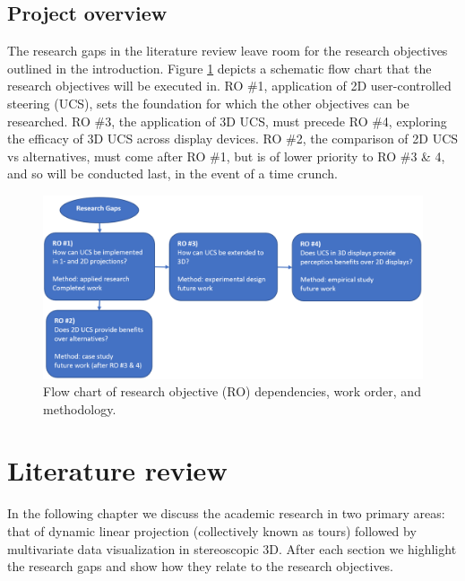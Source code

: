 \documentclass{monashthesis}
\begin{document}
\section{Project overview}\label{ch:projectoverview}

The research gaps in the literature review leave room for the research
objectives outlined in the introduction. Figure
\ref{fig:ProjectOverview} depicts a schematic flow chart that the
research objectives will be executed in. RO \#1, application of 2D
user-controlled steering (UCS), sets the foundation for which the other
objectives can be researched. RO \#3, the application of 3D UCS, must
precede RO \#4, exploring the efficacy of 3D UCS across display devices.
RO \#2, the comparison of 2D UCS vs alternatives, must come after RO
\#1, but is of lower priority to RO \#3 \& 4, and so will be conducted
last, in the event of a time crunch.




\begin{figure}

{\centering \includegraphics[width=1\linewidth]{./figures/ProjectOverview} 

}

\caption{Flow chart of research objective (RO)
dependencies, work order, and methodology.}\label{fig:ProjectOverview}
\end{figure}

\chapter{Literature review}\label{ch:lit_review}

In the following chapter we discuss the academic research in two primary
areas: that of dynamic linear projection (collectively known as tours)
followed by multivariate data visualization in stereoscopic 3D. After
each section we highlight the research gaps and show how they relate to
the research objectives.
\end{document}
